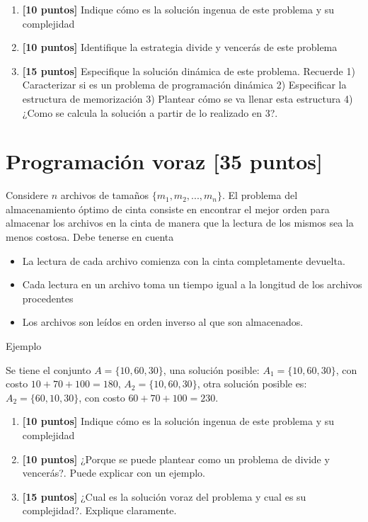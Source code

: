\documentclass[9pt,twocolumn]{article}
\begin{document}
\begin{enumerate}
	\item \textbf{[10 puntos]} Indique cómo es la solución ingenua de este problema y su complejidad 
	\item \textbf{[10 puntos]} Identifique la estrategia divide y vencerás de este problema 
	\item \textbf{[15 puntos]} Especifique la solución dinámica de este problema. Recuerde 1) Caracterizar si es un problema de programación dinámica 2) Especificar la estructura de memorización 3) Plantear cómo se va llenar esta estructura 4) ¿Como se calcula la solución a partir de lo realizado en 3?.
\end{enumerate}



\section{Programación voraz \small{[35 puntos]}} 

Considere $n$ archivos de tamaños $\{m_{1},m_ {2},...,m_{n}\}$. El problema del almacenamiento óptimo de cinta consiste en encontrar el mejor orden para almacenar los archivos en la cinta de manera que la lectura de los mismos sea la menos costosa. Debe tenerse en cuenta
	\begin{itemize}
		\item La lectura de cada archivo comienza con la cinta completamente devuelta.
		\item Cada lectura en un archivo toma un tiempo igual a la longitud de los archivos procedentes
		\item Los archivos son leídos en orden inverso al que son almacenados.
	\end{itemize}
	
Ejemplo

Se tiene el conjunto $A=\{10,60,30\}$, una solución posible: $A_1=\{10,60,30\}$, con costo $10+70+100=180$,  $A_2=\{10,60,30\}$, otra solución posible es:  $A_2=\{60,10,30\}$, con costo $60+70+100=230$.
		
	\begin{enumerate}
		\item \textbf{[10 puntos]} Indique cómo es la solución ingenua de este problema y su complejidad 
		\item \textbf{[10 puntos]} ¿Porque se puede plantear como un problema de divide y vencerás?. Puede explicar con un ejemplo.
		\item \textbf{[15 puntos]} ¿Cual es la solución voraz del problema y cual es su complejidad?. Explique claramente.
	\end{enumerate}
\end{document}
